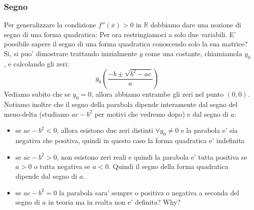 \documentclass{report}
\begin{document}
\subsubsection{Segno}
Per generalizzare la condizione $ f''(\overline{x})> 0 $ in $ \mathbb{R} $ dobbiamo dare una nozione di segno di una forma quadratica:
Per ora restringiamoci a solo due variabili. E' possibile sapere il segno di una forma quadratica conoscendo solo la sua matrice? Si, si puo' dimostrare trattando inizialmente $ y $ come una costante, chiamiamola $ y_0 $, e calcolando gli zeri:
\[
  y_0\left(\frac{-b \pm \sqrt{b^2-ac}}{a}\right)
\]
Vediamo subito che se $ y_0 = 0 $, allora abbiamo entrambe gli zeri nel punto $ (0,0) $. Notiamo inoltre che il segno della parabola dipende interamente dal segno del meno-delta (studiamo $ ac-b^2 $ per motivi che vedremo dopo) e dal segno di $ a $:
\begin{itemize}
\item se $ ac-b^2 < 0 $, allora esistono due zeri distinti $ \forall y_0 \neq 0 $ e la parabola e' sia negativa che positiva, quindi in questo caso la forma quadratica e' indefinita
  \item se $ ac-b^2 > 0 $, non esistono zeri reali e quindi la parabola e' tutta positiva se $ a>0 $ o tutta negativa se $ a < 0 $. Quindi il segno della forma quadratica dipende dal segno di $ a $.
    \item se $ ac-b^2 = 0 $ la parabola sara' sempre o positiva o negativa a seconda del segno di $ a $ in teoria ma in realta non e' definita? Why?

\end{itemize}
\end{document}
